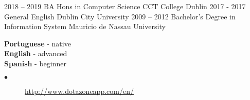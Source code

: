 \documentclass[9pt]{developercv} %
\begin{document}

\begin{entrylist}
	\entry
		{2018 -- 2019}
		{BA Hons in Computer Science}
		{CCT College Dublin}
		{}
	\entry
		{2017 - 2017}
		{General English}
		{Dublin City University}
		{}
	\entry
		{2009 -- 2012}
		{Bachelor's Degree in Information System}
		{Mauricio de Nassau University}
		{}
\end{entrylist}


\begin{minipage}[t]{0.3\textwidth}
	\vspace{-\baselineskip} %

	
	\textbf{Portuguese} - native\\
	\textbf{English} - advanced\\
	\textbf{Spanish} - beginner
\end{minipage}
\begin{minipage}[t]{.7\textwidth}
	\vspace{-\baselineskip} %

	
	\begin{description}
	\item[$\bullet$] \href{http://www.dotazoneapp.com/en/}{http://www.dotazoneapp.com/en/}
\end{description}

\end{minipage}
	
	
	
	

\end{document}
